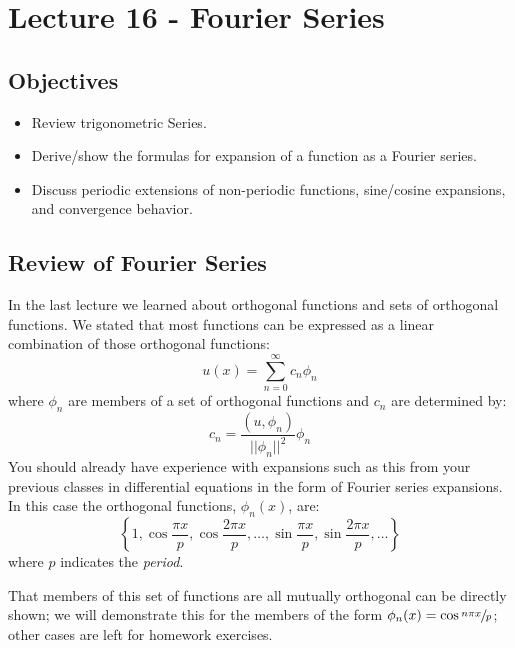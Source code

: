\chapter{Lecture 16 - Fourier Series}
\label{ch:lec16}
\section{Objectives}
\begin{itemize}
\item Review trigonometric Series.
\item Derive/show the formulas for expansion of a function as a Fourier series.
\item Discuss periodic extensions of non-periodic functions, sine/cosine expansions, and convergence behavior.
\end{itemize}

\section{Review of Fourier Series}
In the last lecture we learned about orthogonal functions and sets of orthogonal functions.  We stated that most functions can be expressed as a linear combination of those orthogonal functions:
\begin{equation*}
u(x) = \sum\limits_{n=0}^{\infty} c_n \phi_n
\end{equation*}
where $\phi_n$ are members of a set of orthogonal functions and $c_n$ are determined by:
\begin{equation*}
c_n = \frac{(u,\phi_n)}{||\phi_n||^2}\phi_n
\end{equation*} 
You should already have experience with expansions such as this from your previous classes in differential equations in the form of Fourier series expansions.  In this case the orthogonal functions, $\phi_n(x)$, are:
\begin{equation*}
\left\{1,\cos{\frac{\pi x}{p}},\cos{\frac{2\pi x}{p}},\dots,\sin{\frac{\pi x}{p}}, \sin{\frac{2\pi x}{p}}, \dots \right\}
\end{equation*}
where $p$ indicates the \emph{period}. 

That members of this set of functions are all mutually orthogonal can be directly shown; we will demonstrate this for the members of the form $\phi_n(x) = \cos{\sfrac{n \pi x}{p}}$; other cases are left for homework exercises.

